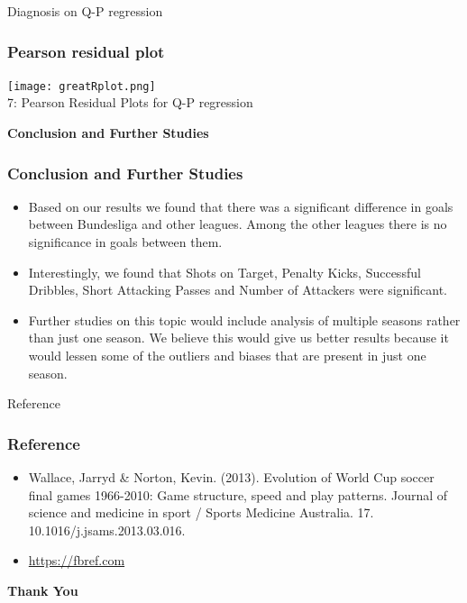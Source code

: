 \documentclass[11pt]{beamer}
\begin{document}
\begin{frame}{Diagnosis on Q-P regression}
	\frametitle{Pearson residual plot}
	\texttt{[image: greatRplot.png]}\\
	\figurename 7: Pearson Residual Plots for Q-P regression
\end{frame}
\begin{frame}
\color{blue}
    \begin{center}
        \Huge\textbf{Conclusion and Further Studies}
    \end{center}
	\end{frame}
\begin{frame}
	\frametitle{Conclusion and Further Studies}
 
 \begin{itemize}
   \setlength\itemsep{3em}
\item Based on our results we found that there was a significant difference in goals between Bundesliga and other leagues. Among the other leagues there is no significance in goals between them. 

\item Interestingly, we found that Shots on Target, Penalty Kicks, Successful Dribbles, Short Attacking Passes and Number of Attackers were significant. 

\item Further studies on this topic would include analysis of multiple seasons rather than just one season. We believe this would give us better results because it would lessen some of the outliers and biases that are present in just one season.
 
\end{itemize}	
\end{frame}

\begin{frame}{Reference}
\setlength\itemsep{3em}
	\frametitle{Reference}
 \begin{itemize}
 
\item Wallace, Jarryd & Norton, Kevin. (2013). Evolution of World Cup soccer final games 1966-2010: Game structure, speed and play patterns. Journal of science and medicine in sport / Sports Medicine Australia. 17. 10.1016/j.jsams.2013.03.016. 
\item \url{ https://fbref.com} 
	\end{itemize}
\end{frame}
\begin{frame}
\color{blue}
    \begin{center}
        \Huge\textbf{Thank You}
    \end{center} 
\end{frame}
\end{document}
